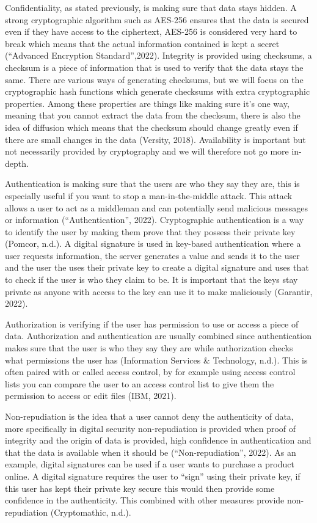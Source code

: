 \documentclass[11pt]{article}
\begin{document}
Confidentiality, as stated previously, is making sure that data stays
hidden. A strong cryptographic algorithm such as AES-256 ensures that
the data is secured even if they have access to the ciphertext, AES-256
is considered very hard to break which means that the actual information
contained is kept a secret (``Advanced Encryption Standard'',2022).
Integrity is provided using checksums, a checksum is a piece of
information that is used to verify that the data stays the same. There
are various ways of generating checksums, but we will focus on the
cryptographic hash functions which generate checksums with extra
cryptographic properties. Among these properties are things like making
sure it's one way, meaning that you cannot extract the data from the
checksum, there is also the idea of diffusion which means that the
checksum should change greatly even if there are small changes in the
data (Versity, 2018). Availability is important but not necessarily
provided by cryptography and we will therefore not go more in-depth.

Authentication is making sure that the users are who they say they are,
this is especially useful if you want to stop a man-in-the-middle
attack. This attack allows a user to act as a middleman and can
potentially send malicious messages or information (``Authentication'',
2022). Cryptographic authentication is a way to identify the user by
making them prove that they possess their private key (Pomcor, n.d.). A
digital signature is used in key-based authentication where a user
requests information, the server generates a value and sends it to the
user and the user the uses their private key to create a digital
signature and uses that to check if the user is who they claim to be. It
is important that the keys stay private as anyone with access to the key
can use it to make maliciously (Garantir, 2022).

Authorization is verifying if the user has permission to use or access a
piece of data. Authorization and authentication are usually combined
since authentication makes sure that the user is who they say they are
while authorization checks what permissions the user has (Information
Services \& Technology, n.d.). This is often paired with or called
access control, by for example using access control lists you can
compare the user to an access control list to give them the permission
to access or edit files (IBM, 2021).

Non-repudiation is the idea that a user cannot deny the authenticity of
data, more specifically in digital security non-repudiation is provided
when proof of integrity and the origin of data is provided, high
confidence in authentication and that the data is available when it
should be (``Non-repudiation'', 2022). As an example, digital signatures
can be used if a user wants to purchase a product online. A digital
signature requires the user to ``sign'' using their private key, if this
user has kept their private key secure this would then provide some
confidence in the authenticity. This combined with other measures
provide non-repudiation (Cryptomathic, n.d.).
\end{document}
